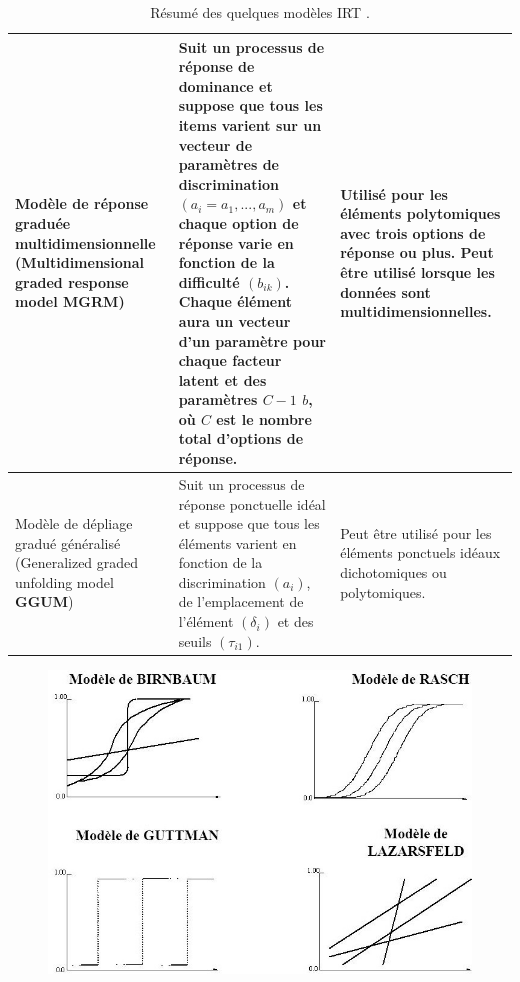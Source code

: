 \begin{table}[H]
\begin{tabular}{|m{4cm}|m{6cm}|m{6cm}|}
	Modèle de réponse graduée multidimensionnelle (Multidimensional graded response model \textbf{MGRM}) &Suit un processus de réponse de dominance et suppose que tous les items varient sur un vecteur de paramètres de discrimination \(\displaystyle (a_{i} = a_{1},...,a_{m} )\) et chaque option de réponse varie en fonction de la difficulté \(\displaystyle (b_{ik})\). Chaque élément aura un vecteur d'un paramètre pour chaque facteur latent et des paramètres \(\displaystyle C - 1 \) \(\displaystyle b \), où \(\displaystyle C \) est le nombre total d'options de réponse. & Utilisé pour les éléments polytomiques avec trois options de réponse ou plus. Peut être utilisé lorsque les données sont multidimensionnelles.\\ \hline
	Modèle de dépliage gradué généralisé (Generalized graded unfolding model \textbf{GGUM}) & Suit un processus de réponse ponctuelle idéal et suppose que tous les éléments varient en fonction de la discrimination \(\displaystyle (a_{i})\), de l'emplacement de l'élément \(\displaystyle (\delta_{i})\) et des seuils \(\displaystyle (\tau_{i1})\). & Peut être utilisé pour les éléments ponctuels idéaux dichotomiques ou polytomiques. \\ \hline
	\end{tabular}
	\caption{Résumé des quelques modèles IRT \cite{nye2020advancing}.}
	\label{irt_modeles}
\end{table}

\begin{figure}[H]
	\begin{center}
		\includegraphics[width=\textwidth]{images/chapitre5/irt_models.jpg}
	\end{center}
	\caption{}
	\label{irt_models}
\end{figure}
